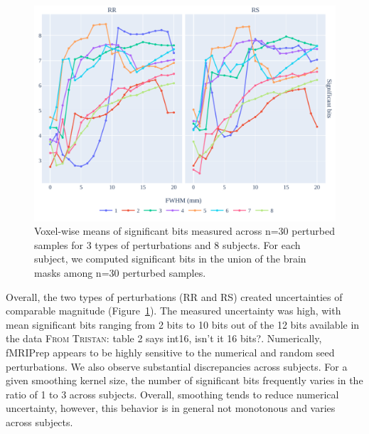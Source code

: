\documentclass[lettersize,journal]{IEEEtran}
\newcommand{\TG}[1]{\color{blue}\textsc{From Tristan:} #1\color{black}\xspace}
\newcommand{\fmriprep}{fMRIPrep\xspace}
\begin{document}
\begin{figure}
    \centering
    \includegraphics[width=\linewidth]{figures/stats.pdf}
    \caption{Voxel-wise means of significant bits
        measured across n=30 perturbed samples for 3 types of perturbations and 8
        subjects. For each subject, we computed significant bits in the union of the brain
        masks among n=30 perturbed samples.}
    \label{fig:significant-digits}
\end{figure}
Overall, the two types of perturbations (RR and RS) created uncertainties of comparable magnitude (Figure~\ref{fig:significant-digits}). The measured uncertainty was high, with mean significant bits ranging from 2 bits to 10 bits out of the 12 bits available in the data \TG{table 2 says int16, isn't it 16 bits?}. Numerically, \fmriprep appears to be highly sensitive to the numerical and random seed perturbations. We also observe substantial discrepancies across subjects. For a given smoothing kernel size, the number of significant bits frequently varies in the ratio of 1 to 3 across subjects. Overall, smoothing tends to reduce numerical uncertainty, however, this behavior is in general not monotonous and varies across subjects.
\end{document}
